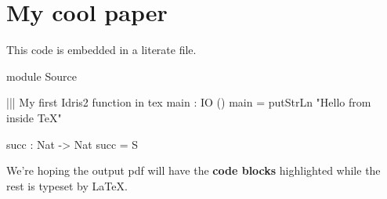 \documentclass{article}
\begin{document}
\section{My cool paper}

This code is embedded in a literate file.

\begin{code}
module Source


||| My first Idris2 function in tex
main : IO ()
main = putStrLn "Hello from inside TeX"
\end{code}

\begin{hidden}
succ : Nat -> Nat
succ = S
\end{hidden}

We're hoping the output pdf will have the \textbf{code blocks} highlighted
while the rest is typeset by \LaTeX{}.
\end{document}
